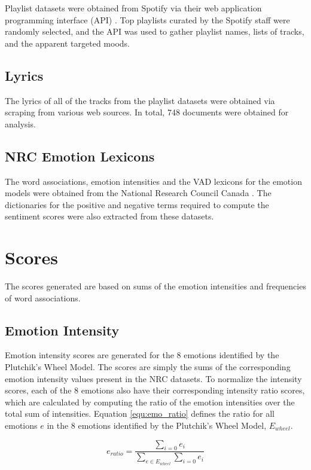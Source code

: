 \documentclass[11pt]{article}
\begin{document}
Playlist datasets were obtained from Spotify via their web application programming interface (API) \cite{spotify}. Top playlists curated by the Spotify staff were randomly selected, and the API was used to gather playlist names, lists of tracks, and the apparent targeted moods.

\subsection{Lyrics}

The lyrics of all of the tracks from the playlist datasets were obtained via scraping from various web sources. In total, 748 documents were obtained for analysis.

\subsection{NRC Emotion Lexicons}

The word associations, emotion intensities and the VAD lexicons for the emotion models were obtained from the National Research Council Canada \cite{LREC18-AIL,Mohammad13,vad-acl2018}. The dictionaries for the positive and negative terms required to compute the sentiment scores were also extracted from these datasets.

\section{Scores}

The scores generated are based on sums of the emotion intensities and frequencies of word associations.

\subsection{Emotion Intensity}

Emotion intensity scores are generated for the 8 emotions identified by the Plutchik's Wheel Model. The scores are simply the sums of the corresponding emotion intensity values present in the NRC datasets. To normalize the intensity scores, each of the 8 emotions also have their corresponding intensity ratio scores, which are calculated by computing the ratio of the emotion intensities over the total sum of intensities. Equation \ref{equ:emo_ratio} defines the ratio for all emotions $e$ in the 8 emotions identified by the Plutchik's Wheel Model, $E_{wheel}$.

\begin{equation} \label{equ:emo_ratio}
  e_{ratio} = \frac{\sum_{i=0}e_i}{\sum_{e \in E_{wheel}}\sum_{i=0}e_i}
\end{equation}
\end{document}
